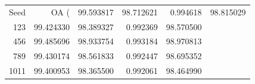 \begin{tabular}{rrrrr}
\toprule
Seed & OA (%
 & 99.593817 & 98.712621 & 0.994618 & 98.815029 \\
123 & 99.424330 & 98.389327 & 0.992369 & 98.570500 \\
456 & 99.485696 & 98.933754 & 0.993184 & 98.970813 \\
789 & 99.430174 & 98.561833 & 0.992447 & 98.695352 \\
1011 & 99.400953 & 98.365500 & 0.992061 & 98.464990 \\
\bottomrule
\end{tabular}
